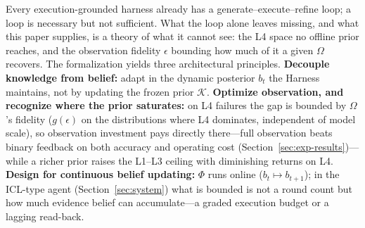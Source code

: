 Every execution-grounded harness already has a generate--execute--refine loop; a loop is necessary but not sufficient. What the loop alone leaves missing, and what this paper supplies, is a theory of what it cannot see: the L4 space no offline prior reaches, and the observation fidelity $\epsilon$ bounding how much of it a given $\Omega$ recovers. The formalization yields three architectural principles.
\textbf{Decouple knowledge from belief:} adapt in the dynamic posterior $b_t$ the Harness maintains, not by updating the frozen prior $\mathcal{K}$.
\textbf{Optimize observation, and recognize where the prior saturates:} on L4 failures the gap is bounded by $\Omega$'s fidelity ($g(\epsilon)$ on the distributions where L4 dominates, independent of model scale), so observation investment pays directly there---full observation beats binary feedback on both accuracy and operating cost (Section~\ref{sec:exp-results})---while a richer prior raises the L1--L3 ceiling with diminishing returns on L4.
\textbf{Design for continuous belief updating:} $\Phi$ runs online ($b_t\mapsto b_{t+1}$); in the ICL-type agent (Section~\ref{sec:system}) what is bounded is not a round count but how much evidence belief can accumulate---a graded execution budget or a lagging read-back.
